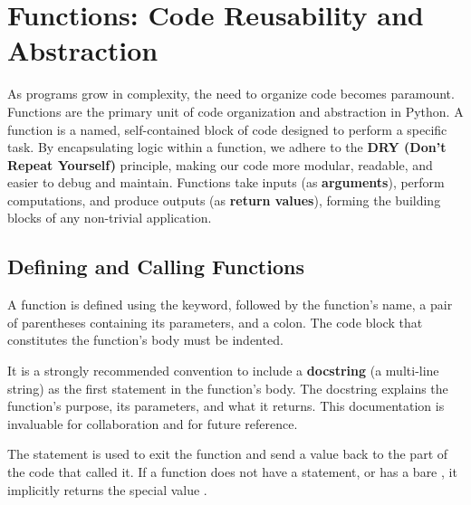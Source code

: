 \section{Functions: Code Reusability and Abstraction}
\label{sec:functions}
As programs grow in complexity, the need to organize code becomes paramount. Functions are the primary unit of code organization and abstraction in Python. A function is a named, self-contained block of code designed to perform a specific task. By encapsulating logic within a function, we adhere to the \textbf{DRY (Don't Repeat Yourself)} principle, making our code more modular, readable, and easier to debug and maintain. Functions take inputs (as \textbf{arguments}), perform computations, and produce outputs (as \textbf{return values}), forming the building blocks of any non-trivial application.

\subsection{Defining and Calling Functions}
\label{subsec:function_definition}
A function is defined using the  keyword, followed by the function's name, a pair of parentheses containing its parameters, and a colon. The code block that constitutes the function's body must be indented.

It is a strongly recommended convention to include a \textbf{docstring} (a multi-line string) as the first statement in the function's body. The docstring explains the function's purpose, its parameters, and what it returns. This documentation is invaluable for collaboration and for future reference.

The  statement is used to exit the function and send a value back to the part of the code that called it. If a function does not have a  statement, or has a bare , it implicitly returns the special value .

